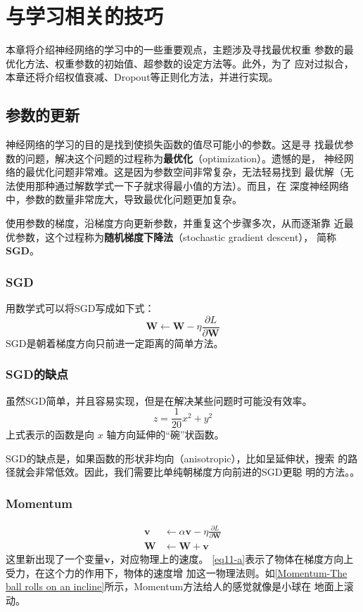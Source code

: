 \chapter{与学习相关的技巧}
本章将介绍神经网络的学习中的一些重要观点，主题涉及寻找最优权重
参数的最优化方法、权重参数的初始值、超参数的设定方法等。此外，为了
应对过拟合，本章还将介绍权值衰减、Dropout等正则化方法，并进行实现。
\section{参数的更新}
神经网络的学习的目的是找到使损失函数的值尽可能小的参数。这是寻
找最优参数的问题，解决这个问题的过程称为\textbf{最优化}（optimization）。遗憾的是，
神经网络的最优化问题非常难。这是因为参数空间非常复杂，无法轻易找到
最优解（无法使用那种通过解数学式一下子就求得最小值的方法）。而且，在
深度神经网络中，参数的数量非常庞大，导致最优化问题更加复杂。

使用参数的梯度，沿梯度方向更新参数，并重复这个步骤多次，从而逐渐靠
近最优参数，这个过程称为\textbf{随机梯度下降法}（stochastic gradient descent），
简称\textbf{SGD}。
\subsection{SGD}
用数学式可以将SGD写成如下式：
\begin{equation*}
    \bm{W}\leftarrow \bm{W}-\eta\frac{\partial L}{\partial \bm{W}}
\end{equation*}
SGD是朝着梯度方向只前进一定距离的简单方法。

\subsection{SGD的缺点}
虽然SGD简单，并且容易实现，但是在解决某些问题时可能没有效率。
\begin{equation*}
    z = \frac{1}{20}x^2+y^2
\end{equation*}
上式表示的函数是向 $x$ 轴方向延伸的“碗”状函数。

SGD的缺点是，如果函数的形状非均向（anisotropic），比如呈延伸状，搜索
的路径就会非常低效。因此，我们需要比单纯朝梯度方向前进的SGD更聪
明的方法。。

\subsection{Momentum}
\begin{subequations}
    \begin{align}
        \bm{v} & \leftarrow  \alpha \bm{v}-\eta\frac{\partial L}{\partial \bm{W}} \label{eq11-a} \\
        \bm{W} & \leftarrow \bm{W}+\bm{v}\label{eq11-b}
    \end{align}
\end{subequations}
这里新出现了一个变量$\bm{v}$，对应物理上的速度。
\autoref{eq11-a}表示了物体在梯度方向上受力，在这个力的作用下，物体的速度增
加这一物理法则。如\autoref{Momentum-The ball rolls on an incline}所示，Momentum方法给人的感觉就像是小球在
地面上滚动。

